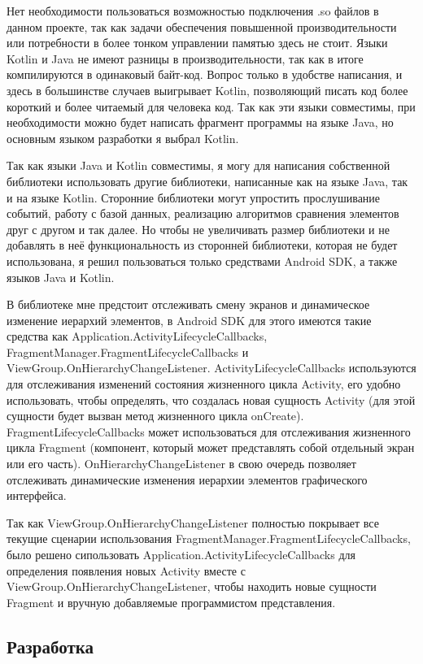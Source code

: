 \documentclass[a4paper,14pt]{extarticle} %
\begin{document}
	Нет необходимости пользоваться возможностью подключения .so файлов в данном проекте, так как задачи обеспечения повышенной производительности или потребности в более тонком управлении памятью здесь не стоит. Языки Kotlin и Java не имеют разницы в производительности, так как в итоге компилируются в одинаковый байт-код. Вопрос только в удобстве написания, и здесь в большинстве случаев выигрывает Kotlin, позволяющий писать код более короткий и более читаемый для человека код. Так как эти языки совместимы, при необходимости можно будет написать фрагмент программы на языке Java, но основным языком разработки я выбрал Kotlin.
	
	Так как языки Java и Kotlin совместимы, я могу для написания собственной библиотеки использовать другие библиотеки, написанные как на языке Java, так и на языке Kotlin. Сторонние библиотеки могут упростить прослушивание событий, работу с базой данных, реализацию алгоритмов сравнения элементов друг с другом и так далее. Но чтобы не увеличивать размер библиотеки и не добавлять в неё функциональность из сторонней библиотеки, которая не будет использована, я решил пользоваться только средствами Android SDK, а также языков Java и Kotlin.
	
	В библиотеке мне предстоит отслеживать смену экранов и динамическое изменение иерархий элементов, в Android SDK для этого имеются такие средства как Application.ActivityLifecycleCallbacks, FragmentManager.FragmentLifecycleCallbacks и ViewGroup.OnHierarchyChangeListener. ActivityLifecycleCallbacks используются для отслеживания изменений состояния жизненного цикла Activity, его удобно использовать, чтобы определять, что создалась новая сущность Activity (для этой сущности будет вызван метод жизненного цикла onCreate). FragmentLifecycleCallbacks может использоваться для отслеживания жизненного цикла Fragment (компонент, который может представлять собой отдельный экран или его часть). OnHierarchyChangeListener в свою очередь позволяет отслеживать динамические изменения иерархии элементов графического интерфейса.
	
	Так как ViewGroup.OnHierarchyChangeListener полностью покрывает все текущие сценарии использования FragmentManager.FragmentLifecycleCallbacks, было решено сипользовать Application.ActivityLifecycleCallbacks для определения появления новых Activity вместе с ViewGroup.OnHierarchyChangeListener, чтобы находить новые сущности Fragment и вручную добавляемые программистом представления.

	\subsection{Разработка}
	
\end{document}
